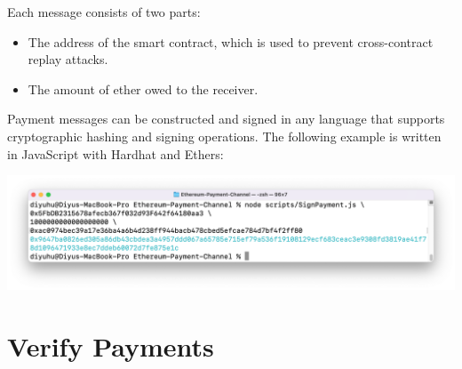 \documentclass[11pt]{article}
\begin{document}
    Each message consists of two parts:
    \begin{itemize}
        \item The address of the smart contract, which is used to prevent cross-contract replay attacks.
        \item The amount of ether owed to the receiver.
    \end{itemize}

    Payment messages can be constructed and signed in any language that supports cryptographic hashing and signing
    operations.
    The following example is written in JavaScript with Hardhat and Ethers:
    
    \includegraphics[width=\textwidth]{./images/sign-message-example}
    
    
    \section{Verify Payments}\label{sec:verify-payments}
\end{document}
